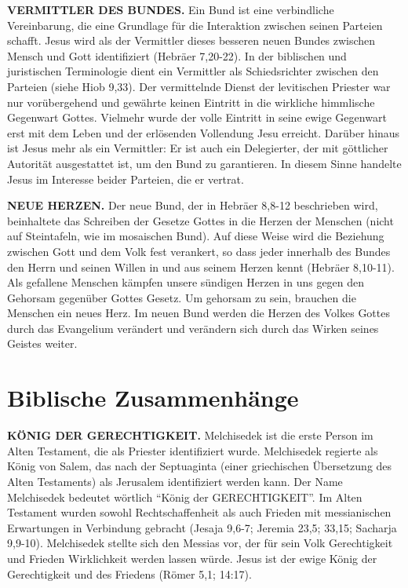 \documentclass[]{krantz}
\begin{document}
\textbf{VERMITTLER DES BUNDES.} Ein Bund ist eine verbindliche
Vereinbarung, die eine Grundlage für die Interaktion zwischen seinen
Parteien schafft. Jesus wird als der Vermittler dieses besseren neuen
Bundes zwischen Mensch und Gott identifiziert (Hebräer 7,20-22). In der
biblischen und juristischen Terminologie dient ein Vermittler als
Schiedsrichter zwischen den Parteien (siehe Hiob 9,33). Der vermittelnde
Dienst der levitischen Priester war nur vorübergehend und gewährte
keinen Eintritt in die wirkliche himmlische Gegenwart Gottes. Vielmehr
wurde der volle Eintritt in seine ewige Gegenwart erst mit dem Leben und
der erlösenden Vollendung Jesu erreicht. Darüber hinaus ist Jesus mehr
als ein Vermittler: Er ist auch ein Delegierter, der mit göttlicher
Autorität ausgestattet ist, um den Bund zu garantieren. In diesem Sinne
handelte Jesus im Interesse beider Parteien, die er vertrat.

\textbf{NEUE HERZEN.} Der neue Bund, der in Hebräer 8,8-12 beschrieben
wird, beinhaltete das Schreiben der Gesetze Gottes in die Herzen der
Menschen (nicht auf Steintafeln, wie im mosaischen Bund). Auf diese
Weise wird die Beziehung zwischen Gott und dem Volk fest verankert, so
dass jeder innerhalb des Bundes den Herrn und seinen Willen in und aus
seinem Herzen kennt (Hebräer 8,10-11). Als gefallene Menschen kämpfen
unsere sündigen Herzen in uns gegen den Gehorsam gegenüber Gottes
Gesetz. Um gehorsam zu sein, brauchen die Menschen ein neues Herz. Im
neuen Bund werden die Herzen des Volkes Gottes durch das Evangelium
verändert und verändern sich durch das Wirken seines Geistes weiter.

\section{Biblische Zusammenhänge}\label{biblische-zusammenhuxe4nge-5}

\textbf{KÖNIG DER GERECHTIGKEIT.} Melchisedek ist die erste Person im
Alten Testament, die als Priester identifiziert wurde. Melchisedek
regierte als König von Salem, das nach der Septuaginta (einer
griechischen Übersetzung des Alten Testaments) als Jerusalem
identifiziert werden kann. Der Name Melchisedek bedeutet wörtlich
``König der GERECHTIGKEIT''. Im Alten Testament wurden sowohl
Rechtschaffenheit als auch Frieden mit messianischen Erwartungen in
Verbindung gebracht (Jesaja 9,6-7; Jeremia 23,5; 33,15; Sacharja
9,9-10). Melchisedek stellte sich den Messias vor, der für sein Volk
Gerechtigkeit und Frieden Wirklichkeit werden lassen würde. Jesus ist
der ewige König der Gerechtigkeit und des Friedens (Römer 5,1; 14:17).
\end{document}

